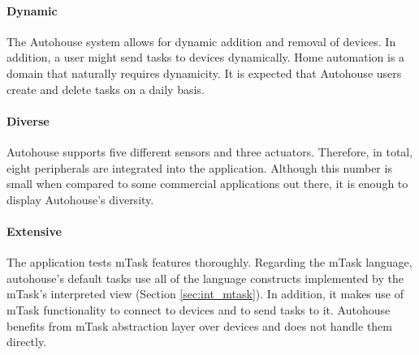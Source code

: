 \paragraph{Dynamic} The Autohouse system allows for dynamic addition and removal of devices. In addition, a user might send tasks to devices dynamically. Home automation is a domain that naturally requires dynamicity. It is expected that Autohouse users create and delete tasks on a daily basis.

\paragraph{Diverse} Autohouse supports five different sensors and three actuators. Therefore, in total, eight peripherals are integrated into the application. Although this number is small when compared to some commercial applications out there, it is enough to display Autohouse's diversity.

\paragraph{Extensive} The application tests \gls{mTask} features thoroughly. Regarding the \gls{mTask} language, \gls{autohouse}'s default tasks use all of the language constructs implemented by the \gls{mTask}'s interpreted view (Section \ref{sec:int_mtask}). In addition, it makes use of \gls{mTask} functionality to connect to devices and to send tasks to it. Autohouse benefits from \gls{mTask} abstraction layer over devices and does not handle them directly.

